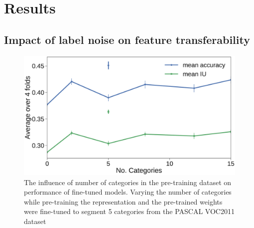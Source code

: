 \section{Results}
\label{sec:results}
\subsection{Impact of label noise on feature transferability}


\begin{figure}[t]
\centering
   \includegraphics[width=1.\linewidth]{img/num_classes.eps}
\caption{
The influence of number of categories in the pre-training dataset on performance of fine-tuned models.
Varying the number of categories while pre-training the representation and the pre-trained weights were fine-tuned to segment 5 categories from the PASCAL VOC2011 dataset
}
\label{fig:categories}
\end{figure}

